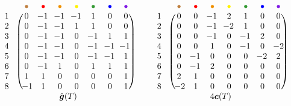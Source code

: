 \(
\begin{blockarray}{ccccccccc}
	& & {\color{brown} \bullet} & {\color{red} \bullet} & {\color{orange} \bullet} & {\color{yellow} \bullet} & {\color{green} \bullet} & {\color{blue} \bullet} & {\color{violet} \bullet} \\
	\begin{block}{c@{\hspace*{-.1cm}}c(ccccccc)}
	1 & & 0 & \!\! -1 \!\! & \!\! -1 \!\! & \!\! -1 \!\! & 1 & 0 & 0 \\
	2 & & 0 & \!\! -1 \!\! & \!\! -1 \!\! & 1 & 1 & 0 & 0 \\
	3 & & 0 & \!\! -1 \!\! & \!\! -1 \!\! & 0 & \!\! -1 \!\! & 1 & 1 \\
	4 & & 0 & \!\! -1 \!\! & \!\! -1 \!\! & 0 & \!\! -1 \!\! & \!\! -1 \!\! & \!\!\! -1 \! \\
	5 & & 0 & \!\! -1 \!\! & \!\! -1 \!\! & 0 & \!\! -1 \!\! & \!\! -1 \!\! & 1 \\
	6 & & 0 & \!\! -1 \!\! & 1 & 0 & 1 & 1 & 1 \\
	7 & & 1 & 1 & 0 & 0 & 0 & 0 & 1 \\
	8 & & \! -1 \!\!\! & 1 & 0 & 0 & 0 & 0 & 1 \\
	\end{block}
	& & & & \multicolumn{2}{c}{$\hat{\b{g}}(T)$} & &
\end{blockarray}
%
\qquad
%
\begin{blockarray}{ccccccccc}
	& & {\color{brown} \bullet} & {\color{red} \bullet} & {\color{orange} \bullet} & {\color{yellow} \bullet} & {\color{green} \bullet} & {\color{blue} \bullet} & {\color{violet} \bullet} \\
	\begin{block}{c@{\hspace*{-.1cm}}c(ccccccc)}
	1 & & 0 & 0 & \!\! -1 \!\! & 2 & 1 & 0 & 0 \\
	2 & & 0 & 0 & \!\! -1 \!\! & \!\! -2 \!\! & 1 & 0 & 0 \\
	3 & & 0 & 0 & \!\! -1 \!\! & 0 & \!\! -1 \!\! & 2 & 0 \\
	4 & & 0 & 0 & 1 & 0 & \!\! -1 \!\! & 0 & \!\! -2 \!\! \\
	5 & & 0 & \!\! -1 \!\! & 0 & 0 & 0 & \!\! -2 \!\! & 2 \\
	6 & & 0 & \!\! -1 \!\! & 2 & 0 & 0 & 0 & 0 \\
	7 & & 2 & 1 & 0 & 0 & 0 & 0 & 0 \\
	8 & & \! -2 \!\!\! & 1 & 0 & 0 & 0 & 0 & 0 \\
	\end{block}
	& & & & \multicolumn{2}{c}{$4\b{c}(T)$} & &
\end{blockarray}
\)